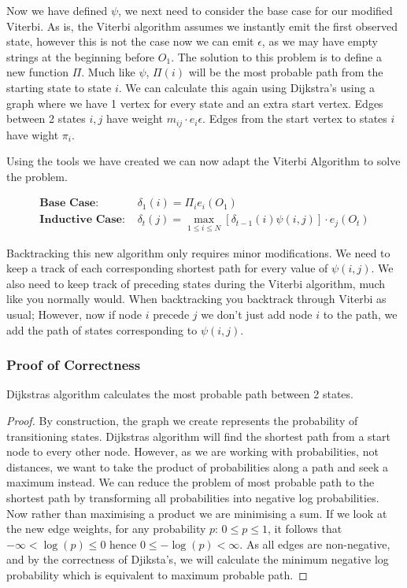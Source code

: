 Now we have defined $\psi$, we next need to consider the base case for our modified Viterbi.
As is, the Viterbi algorithm assumes we instantly emit the first observed state, however this is not the case now we can emit $\epsilon$, as we may have empty strings at the beginning before $O_1$. 
The solution to this problem is to define a new function $\Pi$. 
Much like $\psi$, $\Pi(i)$ will be the most probable path from the starting state to state $i$. 
We can calculate this again using Dijkstra's using a graph where we have 1 vertex for every state and an extra start vertex.
Edges between 2 states $i,j$ have weight $m_{ij}\cdot e_i{\epsilon}$. Edges from the start vertex to states $i$ have wight $\pi_i$.

Using the tools we have created we can now adapt the Viterbi Algorithm to solve the problem.


\begin{align*}
    \textbf{Base Case: } &\delta_1(i) = \Pi_i e_i(O_1)\\
    \textbf{Inductive Case: } &\delta_t(j) = \max_{1\leq i \leq N}[\delta_{t-1}(i)\psi(i,j)]\cdot e_j(O_t)
\end{align*}

Backtracking this new algorithm only requires minor modifications. 
We need to keep a track of each corresponding shortest path for every value of $\psi(i,j)$.
We also need to keep track of preceding states during the Viterbi algorithm, much like you normally would.
When backtracking you backtrack through Viterbi as usual; However, now if node $i$ precede $j$ we don't just add node $i$ to the path, we add the path of states corresponding to $\psi(i,j)$.

\subsubsection*{Proof of Correctness}


\begin{lemma}
    \label{prb:brouwer}
    Dijkstras algorithm calculates the most probable path between 2 states.
\end{lemma}
\begin{proof}
    By construction, the graph we create represents the probability of transitioning states. 
    Dijkstras algorithm will find the shortest path from a start node to every other node. 
    However, as we are working with probabilities, not distances, we want to take the product of probabilities along a path and seek a maximum instead.
    We can reduce the problem of most probable path to the shortest path by transforming all probabilities into negative log probabilities. Now rather than maximising a product we are minimising a sum.
    If we look at the new edge weights, for any probability $p$: $0 \leq p \leq 1$, it follows that $-\infty < \log(p) \leq 0$ hence $0 \leq -\log(p) < \infty$.
    As all edges are non-negative, and by the correctness of Djiksta's, we will calculate the minimum negative log probability which is equivalent to maximum probable path.
\end{proof}


